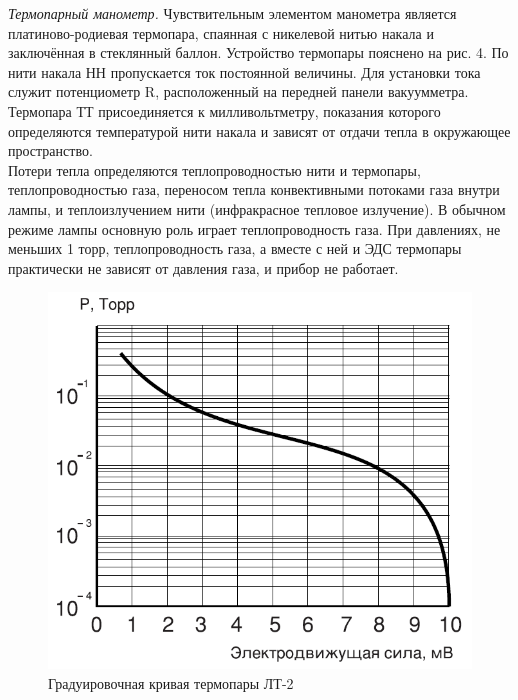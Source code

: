 \documentclass[a4paper, 12pt]{article}
\begin{document}
 \textit{Термопарный манометр.} Чувствительным элементом манометра является платиново-родиевая термопара, спаянная с никелевой нитью накала и заключённая в стеклянный баллон. Устройство термопары пояснено на рис. 4. По нити накала НН пропускается ток постоянной величины. Для установки тока служит потенциометр R, расположенный на передней панели вакуумметра. Термопара ТТ присоединяется к милливольтметру, показания которого определяются температурой нити накала и зависят от отдачи тепла в окружающее пространство. \\
 
 Потери тепла определяются теплопроводностью нити и термопары, теплопроводностью газа, переносом тепла конвективными потоками газа внутри лампы, и теплоизлучением нити (инфракрасное тепловое излучение). В обычном режиме лампы основную роль играет теплопроводность газа. При давлениях, не меньших 1 торр, теплопроводность газа, а вместе с ней и ЭДС термопары практически не зависят от давления газа, и прибор не работает. \\

 \begin{figure}[!h]
 	\centering
 	\includegraphics[width=0.5\linewidth]{7.png}
 	\caption[]{Градуировочная кривая термопары ЛТ-2}
 	\label{fig:Градуировочная кривая}
 \end{figure}
\end{document}
